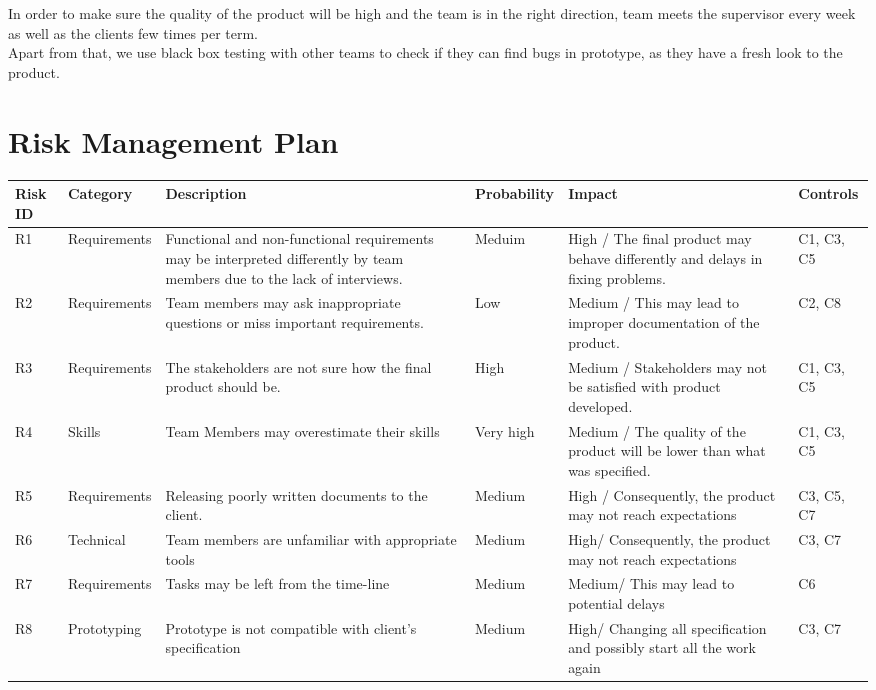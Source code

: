 \documentclass{l3deliverable}
\begin{document}
{In order to make sure the quality of the product will be high and the team is in the right direction, team meets the supervisor every week as well as the clients few times per term.\\

Apart from that, we use black box testing with other teams to check if they can find bugs in prototype, as they have a fresh look to the product.\\


\section{Risk Management Plan}

\begin{center}{
\begin{tabular}{|p{2cm}|p{2cm}|p{3cm}|p{2cm}|p{3cm}|p{2cm}|}
\hline \textbf{Risk ID} &\textbf{Category} & \textbf{Description} & \textbf{Probability} & \textbf{Impact} & \textbf{Controls}\\
\hline R1 & Requirements & Functional and non-functional requirements may be interpreted differently by team members due to the lack of interviews. & Meduim & High / The final product may behave differently and delays in fixing problems. & C1, C3, C5\\
\hline R2 & Requirements & Team members may ask inappropriate questions or miss important requirements. & Low & Medium / This may lead to improper documentation of the product. & C2, C8\\
\hline R3 & Requirements & The stakeholders are not sure how the final product should be. & High & Medium / Stakeholders may not be satisfied with product developed. & C1, C3, C5\\
\hline R4 & Skills & Team Members may overestimate their skills & Very high & Medium / The quality of the product will be lower than what was specified. & C1, C3, C5\\
\hline R5 & Requirements & Releasing poorly written documents to the client. & Medium & High / Consequently, the product may not reach expectations & C3, C5, C7\\
\hline R6 & Technical & Team members are unfamiliar with appropriate tools & Medium & High/ Consequently, the product may not reach expectations & C3, C7\\
\hline R7 & Requirements & Tasks may be left from the time-line & Medium & Medium/ This may lead to potential delays & C6\\
\hline R8 & Prototyping & Prototype is not compatible with client's specification & Medium & High/ Changing all specification and possibly start all the work again & C3, C7\\
\hline
\end{tabular} }
\end{center}

}
\end{document}
